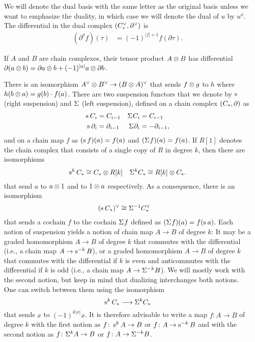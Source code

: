 We will denote the dual basis with the same letter as the original basis unless we want to emphasize the duality, in which case we will denote the dual of $u$ by $u^\dd$. The differential in the dual complex $(\ucocadenas,\partial^\dd)$ is
\begin{align*}
	(\partial^\dd f)(\tau) &= (-1)^{|f|+1} f(\partial \tau). %
\end{align*}
\begin{convention}
	If $A$ and $B$ are chain complexes, their tensor product $A \ot B$ has differential $\partial(a \ot b) = \partial a \ot b + (-1)^{|a|}a \ot \partial b$.
\end{convention}
	There is an isomorphism $A^\dd \ot B^\dd \to (B \ot A)^{\dd}$ that sends $f \ot g$ to $h$ where $h(b \ot a) = g(b)\cdot f(a)$. There are two suspension functors that we denote by $\sus{}$ (right suspension) and $\susp{}$ (left suspension), defined on a chain complex $(\ucadenas,\partial)$ as
\begin{align*}
	\sus{} \ucadenas[i] &= \ucadenas[i-1] & \susp{} \ucadenas[i] &= \ucadenas[i-1] \\
	\sus{} \partial_i &= \partial_{i-1} & \susp{} \partial_i &= -\partial_{i-1},
\end{align*}
and on a chain map $f$ as $(\sus{}f)(a) = f(a)$ and $(\susp{} f)(a) = f(a)$. If $R[1]$ denotes the chain complex that consists of a single copy of $R$ in degree $k$, then there are isomorphisms
\begin{align*}
	\sus{k} \ucadenas &\cong \ucadenas \ot R[k] & \susp{k} \ucadenas \cong R[k] \ot \ucadenas.
\end{align*}
that send $a$ to $a \ot 1$ and to $1 \ot a$ respectively. As a consequence, there is an isomorphism
\begin{align*}
(\sus{}\ucadenas )^\dd &\cong \susp{-1}\ucocadenas
\end{align*}
that sends a cochain $f$ to the cochain $\susp{}f$ defined as $(\susp{}f)(a) = f(\sus{}a)$.
Each notion of suspension yields a notion of chain map $A \to B$ of degree $k$: It may be a graded homomorphism $A \to B$ of degree $k$ that commutes with the differential (i.e., a chain map $A \to \sus{-k} B$), or a graded homomorphism $A \to B$ of degree $k$ that commutes with the differential if $k$ is even and anticommutes with the differential if $k$ is odd (i.e., a chain map $A \to \susp{-k}B$). We will mostly work with the second notion, but keep in mind that dualizing interchanges both notions. One can switch between them using the isomorphism
\[
\sus{k}\ucadenas \lra \susp{k}\ucadenas
\]
that sends $x$ to $(-1)^{k|x|}x$. It is therefore advisable to write a map $f \colon A \to B$ of degree $k$ with the first notion as $f \colon \sus{k}A \to B$ or $f \colon A \to \sus{-k}B$ and with the second notion as $f \colon \susp{k}A \to B$ or $f \colon A \to \susp{-k}B$.

